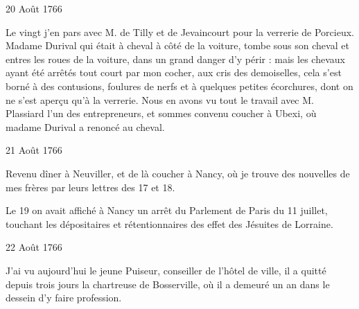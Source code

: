                      \begin{diary}{20 Août 1766}{}


                           Le vingt j'en pars avec M.
                           de Tilly et
                           de Jevaincourt pour
                              la verrerie de
                           Porcieux.
                           Madame Durival qui était à cheval à côté
                           de la voiture, tombe sous son cheval et entres
                           les roues de la voiture, dans un grand danger
                           d'y périr : mais les chevaux ayant été arrêtés
                           tout court par mon cocher, aux cris des
                           demoiselles, cela s'est borné à des contusions, foulures de nerfs et à quelques petites
                           écorchures, dont on ne s'est aperçu qu'à
                           la verrerie. Nous en avons vu tout le
                           travail avec M. Plassiard l'un
                           des entrepreneurs,
                           et sommes convenu coucher à Ubexi, où madame
                              Durival a renoncé au cheval. \bigskip


                     \end{diary}

                     \begin{diary}{21 Août 1766}{}

                         Revenu dîner à Neuviller, et de là coucher
                           à Nancy, où je trouve des
                           nouvelles de
                           mes
                              frères par leurs lettres des 17 et 18. \bigskip



                           Le 19 on avait affiché à Nancy un arrêt
                           du Parlement de Paris du
                              11 juillet, touchant
                           les dépositaires et rétentionnaires des effet
                           des Jésuites de Lorraine. \bigskip


                     \end{diary}

                     \begin{diary}{22 Août 1766}{}

                         J'ai vu aujourd'hui le jeune Puiseur, conseiller de
                           l'hôtel de ville, il a quitté
                           depuis trois jours
                           la chartreuse de
                              Bosserville, où il a demeuré
                           un an dans le dessein d'y faire profession. \bigskip


                     \end{diary}

